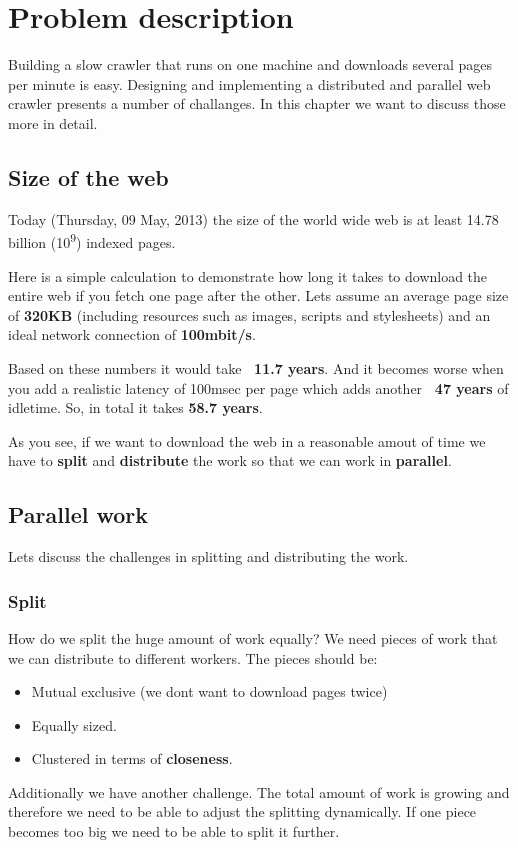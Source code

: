 \chapter{Problem description} %
Building a slow crawler that runs on one machine and downloads several pages per minute is easy. Designing and implementing a distributed and parallel web crawler presents a number of challanges. In this chapter we want to discuss those more in detail.

\label{Chapter3} %


\section{Size of the web}
Today (Thursday, 09 May, 2013) the size of the world wide web is at least 14.78 billion (10\textsuperscript{9}) indexed pages.\cite{wwwsize}

Here is a simple calculation to demonstrate how long it takes to download the entire web if you fetch one page after the other.
Lets assume an average page size of \textbf{320KB} \cite{webmetrics} (including resources such as images, scripts and stylesheets) and an ideal network connection of \textbf{100mbit/s}.

Based on these numbers it would take \textbf{~11.7 years}. And it becomes worse when you add a realistic latency of 100msec per page which adds another \textbf{~47 years} of idletime. So, in total it takes \textbf{58.7 years}.

As you see, if we want to download the web in a reasonable amout of time we have to \textbf{split} and \textbf{distribute} the work so that we can work in \textbf{parallel}.

\section{Parallel work}
Lets discuss the challenges in splitting and distributing the work.
\subsection{Split}
How do we split the huge amount of work equally? We need pieces of work that we can distribute to different workers. The pieces should be:
\begin{itemize}
\item Mutual exclusive (we dont want to download pages twice)
\item Equally sized.
\item Clustered in terms of \textbf{closeness}.
\end{itemize}
Additionally we have another challenge. The total amount of work is growing and therefore we need to be able to adjust the splitting dynamically. If one piece becomes too big we need to be able to split it further.
